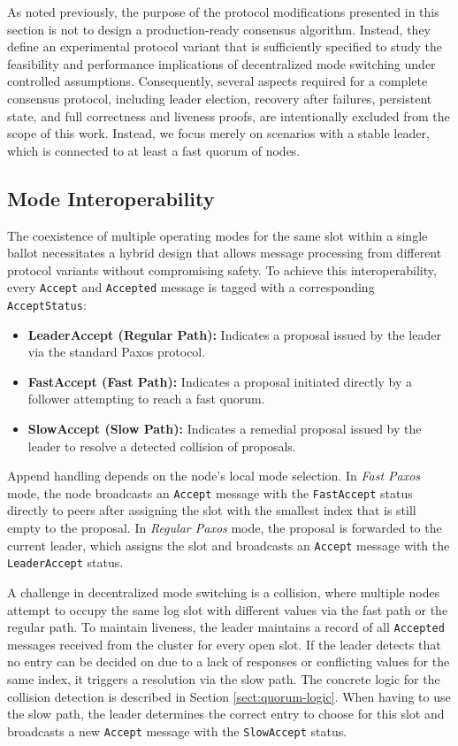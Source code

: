 As noted previously, the purpose of the protocol modifications presented in this section is not to design a production-ready consensus algorithm. Instead, they define an experimental protocol variant that is sufficiently specified to study the feasibility and performance implications of decentralized mode switching under controlled assumptions. Consequently, several aspects required for a complete consensus protocol, including leader election, recovery after failures, persistent state, and full correctness and liveness proofs, are intentionally excluded from the scope of this work. Instead, we focus merely on scenarios with a stable leader, which is connected to at least a fast quorum of nodes.

\subsection{Mode Interoperability}
\label{sect:mode-interoperability}
The coexistence of multiple operating modes for the same slot within a single ballot necessitates a hybrid design that allows message processing from different protocol variants without compromising safety. To achieve this interoperability, every \texttt{Accept} and \texttt{Accepted} message is tagged with a corresponding \texttt{AcceptStatus}:
\begin{itemize}
\item \textbf{LeaderAccept (Regular Path):} Indicates a proposal issued by the leader via the standard Paxos protocol.
\item \textbf{FastAccept (Fast Path):} Indicates a proposal initiated directly by a follower attempting to reach a fast quorum.
\item \textbf{SlowAccept (Slow Path):} Indicates a remedial proposal issued by the leader to resolve a detected collision of proposals.
\end{itemize}

Append handling depends on the node’s local mode selection. In \textit{Fast Paxos} mode, the node broadcasts an \texttt{Accept} message with the \texttt{FastAccept} status directly to peers after assigning the slot with the smallest index that is still empty to the proposal. In \textit{Regular Paxos} mode, the proposal is forwarded to the current leader, which assigns the slot and broadcasts an \texttt{Accept} message with the \texttt{LeaderAccept} status.

A challenge in decentralized mode switching is a collision, where multiple nodes attempt to occupy the same log slot with different values via the fast path or the regular path. To maintain liveness, the leader maintains a record of all \texttt{Accepted} messages received from the cluster for every open slot. If the leader detects that no entry can be decided on due to a lack of responses or conflicting values for the same index, it triggers a resolution via the slow path. The concrete logic for the collision detection is described in Section \ref{sect:quorum-logic}. When having to use the slow path, the leader determines the correct entry to choose for this slot and broadcasts a new \texttt{Accept} message with the \texttt{SlowAccept} status.


